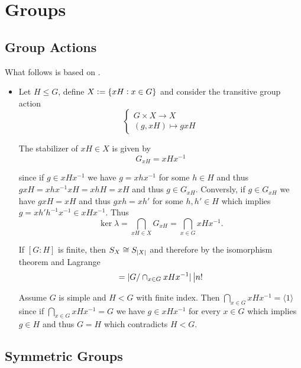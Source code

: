\section{Groups}

\subsection{Group Actions}
What follows is based on \cite[99]{rose2009course}. 

\begin{itemize}
	\item Let $H \leq G$, define $X := \cbr[0]{xH : x \in G}$ and consider the transitive group action
		\begin{equation}
			\begin{cases}
				G \times X \to X\\
				(g,xH) \mapsto gxH
			\end{cases}
		\end{equation}

		The stabilizer of $xH \in X$ is given by 
		\begin{equation}
			G_{xH} = xHx^{-1}
		\end{equation}

		\noindent since if $g \in xHx^{-1}$ we have $g = xhx^{-1}$ for some $h \in H$ and thus $gxH = xhx^{-1}xH = xhH = xH$ and thus $g \in G_{xH}$. Conversly, if $g \in G_{xH}$ we have $gxH = xH$ and thus $gxh = xh'$ for some $h,h' \in H$ which implies $g = xh'h^{-1}x^{-1} \in xHx^{-1}$. Thus 
		\begin{equation}
			\ker \lambda = \bigcap_{xH \in X} G_{xH} = \bigcap_{x \in G}xHx^{-1}.
		\end{equation}

		If $[G:H]$ is finite, then $S_X \cong S_{\abs[0]{X}}$ and therefore by the isomorphism theorem and Lagrange
		\begin{equation}
			[G:\cap_{x \in G}xHx^{-1}] = \abs[0]{G/\cap_{x \in G}xHx^{-1}} \big| n!
		\end{equation}

		Assume $G$ is simple and $H < G$ with finite index. Then $\bigcap_{x \in G}xHx^{-1} = \langle 1 \rangle$ since if $\bigcap_{x \in G}xHx^{-1} = G$ we have $g \in xHx^{-1}$ for every $x \in G$ which implies $g \in H$ and thus $G = H$ which contradicts $H < G$. 
\end{itemize}


\subsection{Symmetric Groups}

